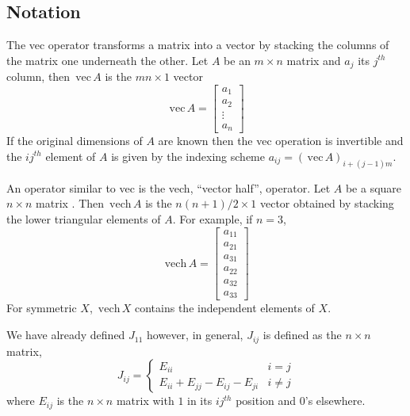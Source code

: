 \documentclass[12pt,doublespace]{article}
\begin{document}
\subsection{Notation}

The vec operator transforms a matrix into a vector by stacking the columns
of the matrix one underneath the other. Let $A$ be an $m\times n$ matrix and 
$a_{j}$ its $j^{th}$ column, then $\,\mathrm{vec}\,A$ is the $mn\times 1$
vector 
\begin{equation}
\,\mathrm{vec}\,A=\left[ 
\begin{array}{c}
a_{1} \\ 
a_{2} \\ 
\vdots \\ 
a_{n}
\end{array}
\right]
\end{equation}
If the original dimensions of $A$ are known then the vec operation is
invertible and the $ij^{th}$ element of $A$ is given by the indexing scheme $%
a_{ij}=\left( \,\mathrm{vec}\,A\right) _{i+\left( j-1\right) m}$.

An operator similar to vec is the vech, ``vector half'', operator. Let $A$
be a square $n\times n$ matrix . Then $\,\mathrm{vech}\,A$ is the $n\left(
n+1\right) /2\times 1$ vector obtained by stacking the lower triangular
elements of $A$. For example, if $n=3$, 
\begin{equation}
\,\mathrm{vech}\,A=\left[ 
\begin{array}{c}
a_{11} \\ 
a_{21} \\ 
a_{31} \\ 
a_{22} \\ 
a_{32} \\ 
a_{33}
\end{array}
\right]
\end{equation}
For symmetric $X$, $\,\mathrm{vech}\,X$ contains the independent elements of 
$X$.

We have already defined $J_{11}$ however, in general, $J_{ij}$ is defined as
the $n\times n$ matrix, 
\begin{equation}
J_{ij}=\left\{ 
\begin{array}{ll}
E_{ii} & i=j \\ 
E_{ii}+E_{jj}-E_{ij}-E_{ji} & i\neq j
\end{array}
\right.  \label{Jij}
\end{equation}
where $E_{ij}$ is the $n\times n$ matrix with $1$ in its $ij^{th}$ position
and $0$'s elsewhere.
\end{document}
